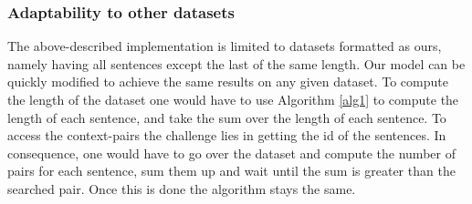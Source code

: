 \subsubsection{Adaptability to other datasets}
The above-described implementation is limited to datasets formatted as ours, namely having all sentences except the last of the same length. Our model can be quickly modified to achieve the same results on any given dataset. To compute the length of the dataset one would have to use Algorithm \ref{alg1} to compute the length of each sentence, and take the sum over the length of each sentence. To access the context-pairs the challenge lies in getting the id of the sentences. In consequence, one would have to go over the dataset and compute the number of pairs for each sentence, sum them up and wait until the sum is greater than the searched pair. Once this is done the algorithm stays the same.

